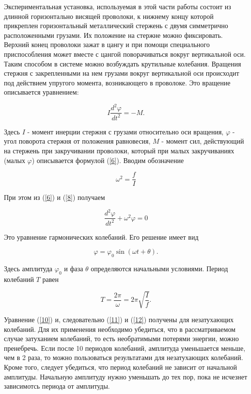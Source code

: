\documentclass[12pt,a4paper]{article}
\begin{document}
Экспериментальная установка, используемая в этой части работы состоит из длинной горизонтально висящей проволоки, к нижнему концу которой прикреплен горизонтальный металлический стержень с двумя симметрично расположенными грузами. Их положение на стержне можно фиксировать. Верхний конец проволоки зажат в цангу и при помощи специального приспособления может вместе с цангой поворачиваться вокруг вертикальной оси. Таким способом в системе можно возбуждать крутильные колебания. Вращения стержня с закрепленными на нем грузами вокруг вертикальной оси происходит под действием упругого момента, возникающего в проволоке. Это вращение описывается уравнением:

\begin{equation}\label{8}
    I\frac{d^2 \varphi}{dt^2} = -M.
\end{equation}

Здесь $I$ - момент инерции стержня с грузами относительно оси вращения, $\varphi$ - угол поворота стержня от положения равновесия, $M$ - момент сил, действующий на стержень при закручивании проволоки, который при малых закручиваниях (малых $\varphi$) описывается формулой (\ref{6}). Вводим обозначение

\begin{equation}\label{9}
    \omega^2 = \frac{f}{I}
\end{equation}

При этом из (\ref{6}) и (\ref{8}) получаем

\begin{equation}\label{10}
    \frac{d^2 \varphi}{dt^2} + \omega^2\varphi =0
\end{equation}

Это уравнение гармонических колебаний. Его решение имеет вид

\begin{equation}\label{11}
    \varphi = \varphi_0\sin(\omega t + \theta).
\end{equation}

Здесь амплитуда $\varphi_0$ и фаза $\theta$ определяются начальными условиями. Период колебаний $T$ равен

\begin{equation}\label{12}
    T = \frac{2\pi}{\omega} = 2\pi\sqrt{\frac{I}{f}}.
\end{equation}

Уравнение (\ref{10}) и, следовательно (\ref{11}) и (\ref{12}) получены для незатухающих колебаний. Для их применения необходимо убедиться, что в рассматриваемом случае затуханием колебаний, то есть необратимыми потерями энергии, можно пренебречь. Если после 10 периодов колебаний, амплитуда уменьшается меньше, чем в 2 раза, то можно пользоваться результатами для незатухающих колебаний. Кроме того, следует убедиться, что период колебаний не зависит от начальной амплитуды. Начальную амплитуду нужно уменьшать до тех пор, пока не исчезнет зависимотсь периода от амплитуды.
\end{document}
